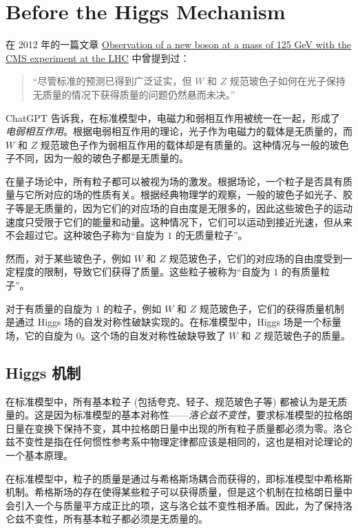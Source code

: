 \chapter{Before the Higgs Mechanism}

在 2012 年的一篇文章 \href{https://inspirehep.net/literature/1124338}{Observation of a new boson at a mass of 125 GeV with the CMS experiment at the LHC} 中曾提到过：

\begin{quote}
    “尽管标准的预测已得到广泛证实，但 $W$ 和 $Z$ 规范玻色子如何在光子保持无质量的情况下获得质量的问题仍然悬而未决。”
\end{quote}

ChatGPT 告诉我，在标准模型中，电磁力和弱相互作用被统一在一起，形成了 \emph{电弱相互作用}。根据电弱相互作用的理论，光子作为电磁力的载体是无质量的，而 $W$ 和 $Z$ 规范玻色子作为弱相互作用的载体却是有质量的。这种情况与一般的玻色子不同，因为一般的玻色子都是无质量的。

在量子场论中，所有粒子都可以被视为场的激发。根据场论，一个粒子是否具有质量与它所对应的场的性质有关。根据经典物理学的观察，一般的玻色子如光子、胶子等是无质量的，因为它们的对应场的自由度是无限多的，因此这些玻色子的运动速度只受限于它们的能量和动量。这种情况下，它们可以运动到接近光速，但从来不会超过它。这种玻色子称为“自旋为 $1$ 的无质量粒子”。

然而，对于某些玻色子，例如 $W$ 和 $Z$ 规范玻色子，它们的对应场的自由度受到一定程度的限制，导致它们获得了质量。这些粒子被称为“自旋为 $1$ 的有质量粒子”。

对于有质量的自旋为 $1$ 的粒子，例如 $W$ 和 $Z$ 规范玻色子，它们的获得质量机制是通过 Higgs 场的自发对称性破缺实现的。在标准模型中，Higgs 场是一个标量场，它的自旋为 $0$。这个场的自发对称性破缺导致了 $W$ 和 $Z$ 规范玻色子的质量。

\section{Higgs 机制}

在标准模型中，所有基本粒子 (包括夸克、轻子、规范玻色子等) 都被认为是无质量的。这是因为标准模型的基本对称性——\emph{洛仑兹不变性}，要求标准模型的拉格朗日量在变换下保持不变，其中拉格朗日量中出现的所有粒子质量都必须为零。洛仑兹不变性是指在任何惯性参考系中物理定律都应该是相同的，这也是相对论理论的一个基本原理。

在标准模型中，粒子的质量是通过与希格斯场耦合而获得的，即标准模型中希格斯机制。希格斯场的存在使得某些粒子可以获得质量，但是这个机制在拉格朗日量中会引入一个与质量平方成正比的项，这与洛仑兹不变性相矛盾。因此，为了保持洛仑兹不变性，所有基本粒子都必须是无质量的。


